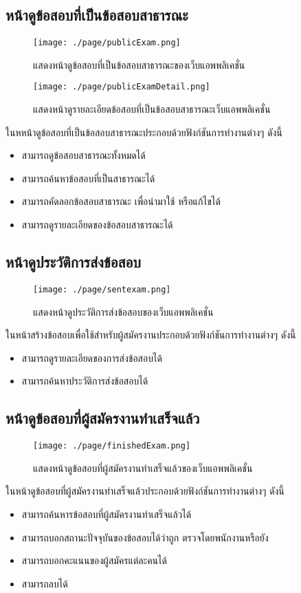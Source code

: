 \subsection{หน้าดูข้อสอบที่เป็นข้อสอบสาธารณะ}
\begin{figure}[H]
  \centering
  \texttt{[image: ./page/publicExam.png]}
  \caption{แสดงหน้าดูข้อสอบที่เป็นข้อสอบสาธารณะของเว็บแอพพลิเคชั่น}
  \label{Fig:publicExams}
\end{figure}
\begin{figure}[H]
  \centering
  \texttt{[image: ./page/publicExamDetail.png]}
  \caption{แสดงหน้าดูรายละเอียดข้อสอบที่เป็นข้อสอบสาธารณะเว็บแอพพลิเคชั่น}
  \label{Fig:publicExamDetails}
\end{figure}
ในหหน้าดูข้อสอบที่เป็นข้อสอบสาธารณะประกอบด้วยฟังก์ชันการทำงานต่างๆ ดังนี้
\begin{itemize}
    \item สามารถดูข้อสอบสาธารณะทั้งหมดได้
    \item สามารถค้นหาข้อสอบที่เป็นสาธารณะได้
    \item สามารถคัดลอกข้อสอบสาธารณะ เพื่อนำมาใช้ หรือแก้ไขได้
    \item สามารถดูรายละเอียดของข้อสอบสาธารณะได้
\end{itemize}

\subsection{หน้าดูประวัติการส่งข้อสอบ}
\begin{figure}[H]
  \centering
  \texttt{[image: ./page/sentexam.png]}
  \caption{แสดงหน้าดูประวัติการส่งข้อสอบของเว็บแอพพลิเคชั่น}
  \label{Fig:sentExam}
\end{figure}
ในหน้าสร้างข้อสอบเพื่อใช้สำหรับผู้สมัครงานประกอบด้วยฟังก์ชันการทำงานต่างๆ ดังนี้
\begin{itemize}
    \item สามารถดูรายละเอียดของการส่งข้อสอบได้
    \item สามารถค้นหาประวัติการส่งข้อสอบได้
\end{itemize}

\subsection{หน้าดูข้อสอบที่ผู้สมัครงานทำเสร็จแล้ว}
\begin{figure}[H]
  \centering
  \texttt{[image: ./page/finishedExam.png]}
  \caption{แสดงหน้าดูข้อสอบที่ผู้สมัครงานทำเสร็จแล้วของเว็บแอพพลิเคชั่น}
  \label{Fig:finishedExam}
\end{figure}
ในหน้าดูข้อสอบที่ผู้สมัครงานทำเสร็จแล้วประกอบด้วยฟังก์ชันการทำงานต่างๆ ดังนี้
\begin{itemize}
    \item สามารถค้นหารข้อสอบที่ผู้สมัครงานทำเสร็จแล้วได้
    \item สามารถบอกสถานะปัจจุบันของข้อสอบได้ว่าถูก ตรวจโดยพนักงานหรือยัง
    \item สามารถบอกคะแนนของผู้สมัครแต่ละคนได้
    \item สามารถลบได้
\end{itemize}

